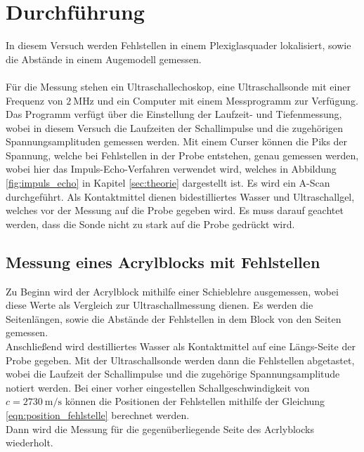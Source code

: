 \section{Durchführung}

    In diesem Versuch werden Fehlstellen in einem Plexiglasquader lokalisiert,
    sowie die Abstände in einem Augemodell gemessen.\\
    \\
    Für die Messung stehen ein Ultraschallechoskop,
    eine Ultraschallsonde mit einer Frequenz von $\SI{2}{\mega\hertz}$ und ein Computer mit einem Messprogramm zur Verfügung.
    Das Programm verfügt über die Einstellung der Laufzeit- und Tiefenmessung,
    wobei in diesem Versuch die Laufzeiten der Schallimpulse und die zugehörigen Spannungsamplituden gemessen werden. 
    Mit einem Curser können die Piks der Spannung,
    welche bei Fehlstellen in der Probe entstehen,
    genau gemessen werden,
    wobei hier das Impuls-Echo-Verfahren verwendet wird,
    welches in Abbildung \ref{fig:impuls_echo} in Kapitel \ref{sec:theorie} dargestellt ist.
    Es wird ein A-Scan durchgeführt.
    Als Kontaktmittel dienen bidestilliertes Wasser und Ultraschallgel,
    welches vor der Messung auf die Probe gegeben wird.
    Es muss darauf geachtet werden,
    dass die Sonde nicht zu stark auf die Probe gedrückt wird.

\subsection{Messung eines Acrylblocks mit Fehlstellen}


    Zu Beginn wird der Acrylblock mithilfe einer Schieblehre ausgemessen,
    wobei diese Werte als Vergleich zur Ultraschallmessung dienen.
    Es werden die Seitenlängen,
    sowie die Abstände der Fehlstellen in dem Block von den Seiten gemessen.\\
    Anschließend wird destilliertes Wasser als Kontaktmittel auf eine Längs-Seite der Probe gegeben.
    Mit der Ultraschallsonde werden dann die Fehlstellen abgetastet,
    wobei die Laufzeit der Schallimpulse und die zugehörige Spannungsamplitude notiert werden.
    Bei einer vorher eingestellen Schallgeschwindigkeit von $c = \SI{2730}{\meter\per\second}$ können die Positionen der Fehlstellen mithilfe der Gleichung \eqref{eqn:position_fehlstelle} berechnet werden.\\
    Dann wird die Messung für die gegenüberliegende Seite des Acrlyblocks wiederholt.

